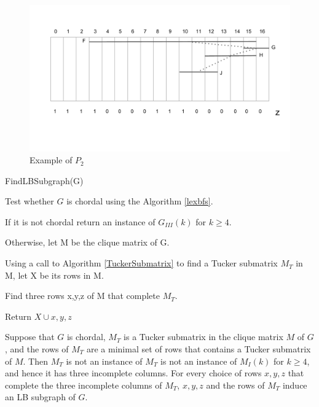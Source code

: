 \begin{figure}[H]
\centering
\includegraphics[width=12cm]{figures/lm_5.pdf}
\caption{Example of $P_2$}
\label{lm_5}
\end{figure}

\begin{algorithm}[H]
\SetAlgoLined
\caption{FindLBSubgraph(G)}
\label{findlb}
\Begin
{    
	Test whether $G$ is chordal using the Algorithm \ref{lexbfs}.
    
    If it is not chordal return an instance of $G_{III}(k)$ for $k \ge 4$.
    
    Otherwise, let M be the clique matrix of G.
    
    Using a call to Algorithm \ref{TuckerSubmatrix} to find a Tucker submatrix $M_T$ in M, let X be its rows in M.
    
    Find three rows {x,y,z} of M that complete $M_T$.
    
    Return $X\cup{x,y,z}$
}       
\end{algorithm}
\begin{lemma}
\cite{lindzey2016linear}
Suppose that $G$ is chordal, $M_T$ is a Tucker submatrix in the clique matrix $M$ of $G$, and the rows of $M_T$ are a minimal set of rows that contains a Tucker submatrix of $M$. Then $M_T$ is not an instance of $M_T$ is not an instance of $M_I(k)$ for $k \ge 4$, and hence it has three incomplete columns. For every choice of rows $x,y,z$ that complete the three incomplete columns of $M_T$, $x,y,z$ and the rows of $M_T$ induce an LB subgraph of $G$.
\end{lemma}



